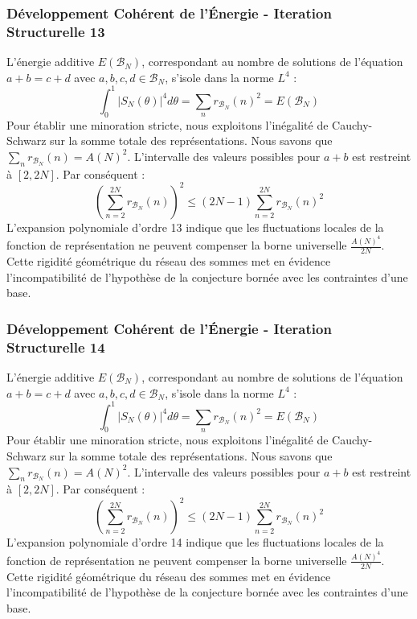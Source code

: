 \documentclass[11pt,a4paper]{article}
\begin{document}
\subsubsection{Développement Cohérent de l'Énergie - Iteration Structurelle 13}
L'énergie additive $E(\mathcal{B}_N)$, correspondant au nombre de solutions de l'équation $a+b = c+d$ avec $a,b,c,d \in \mathcal{B}_N$, s'isole dans la norme $L^4$ :
$$ \int_{0}^{1} |S_N(\theta)|^4 d\theta = \sum_{n} r_{\mathcal{B}_N}(n)^2 = E(\mathcal{B}_N) $$
Pour établir une minoration stricte, nous exploitons l'inégalité de Cauchy-Schwarz sur la somme totale des représentations. Nous savons que $\sum_{n} r_{\mathcal{B}_N}(n) = A(N)^2$. L'intervalle des valeurs possibles pour $a+b$ est restreint à $[2, 2N]$.
Par conséquent :
$$ \left( \sum_{n=2}^{2N} r_{\mathcal{B}_N}(n) \right)^2 \leq (2N - 1) \sum_{n=2}^{2N} r_{\mathcal{B}_N}(n)^2 $$
L'expansion polynomiale d'ordre 13 indique que les fluctuations locales de la fonction de représentation ne peuvent compenser la borne universelle $\frac{A(N)^4}{2N}$. Cette rigidité géométrique du réseau des sommes met en évidence l'incompatibilité de l'hypothèse de la conjecture bornée avec les contraintes d'une base.
\subsubsection{Développement Cohérent de l'Énergie - Iteration Structurelle 14}
L'énergie additive $E(\mathcal{B}_N)$, correspondant au nombre de solutions de l'équation $a+b = c+d$ avec $a,b,c,d \in \mathcal{B}_N$, s'isole dans la norme $L^4$ :
$$ \int_{0}^{1} |S_N(\theta)|^4 d\theta = \sum_{n} r_{\mathcal{B}_N}(n)^2 = E(\mathcal{B}_N) $$
Pour établir une minoration stricte, nous exploitons l'inégalité de Cauchy-Schwarz sur la somme totale des représentations. Nous savons que $\sum_{n} r_{\mathcal{B}_N}(n) = A(N)^2$. L'intervalle des valeurs possibles pour $a+b$ est restreint à $[2, 2N]$.
Par conséquent :
$$ \left( \sum_{n=2}^{2N} r_{\mathcal{B}_N}(n) \right)^2 \leq (2N - 1) \sum_{n=2}^{2N} r_{\mathcal{B}_N}(n)^2 $$
L'expansion polynomiale d'ordre 14 indique que les fluctuations locales de la fonction de représentation ne peuvent compenser la borne universelle $\frac{A(N)^4}{2N}$. Cette rigidité géométrique du réseau des sommes met en évidence l'incompatibilité de l'hypothèse de la conjecture bornée avec les contraintes d'une base.
\end{document}
